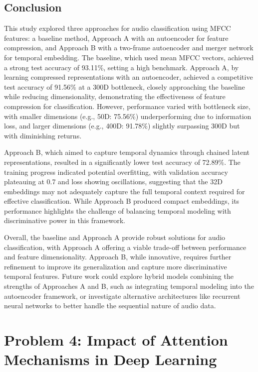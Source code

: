 \documentclass[12pt]{article}
\begin{document}
\subsection{Conclusion}

This study explored three approaches for audio classification using MFCC features: a baseline method, Approach A with an autoencoder for feature compression, and Approach B with a two-frame autoencoder and merger network for temporal embedding. The baseline, which used mean MFCC vectors, achieved a strong test accuracy of 93.11\%, setting a high benchmark. Approach A, by learning compressed representations with an autoencoder, achieved a competitive test accuracy of 91.56\% at a 300D bottleneck, closely approaching the baseline while reducing dimensionality, demonstrating the effectiveness of feature compression for classification. However, performance varied with bottleneck size, with smaller dimensions (e.g., 50D: 75.56\%) underperforming due to information loss, and larger dimensions (e.g., 400D: 91.78\%) slightly surpassing 300D but with diminishing returns.

Approach B, which aimed to capture temporal dynamics through chained latent representations, resulted in a significantly lower test accuracy of 72.89\%. The training progress indicated potential overfitting, with validation accuracy plateauing at 0.7 and loss showing oscillations, suggesting that the 32D embeddings may not adequately capture the full temporal context required for effective classification. While Approach B produced compact embeddings, its performance highlights the challenge of balancing temporal modeling with discriminative power in this framework.

Overall, the baseline and Approach A provide robust solutions for audio classification, with Approach A offering a viable trade-off between performance and feature dimensionality. Approach B, while innovative, requires further refinement to improve its generalization and capture more discriminative temporal features. Future work could explore hybrid models combining the strengths of Approaches A and B, such as integrating temporal modeling into the autoencoder framework, or investigate alternative architectures like recurrent neural networks to better handle the sequential nature of audio data.



\newpage
\section{Problem 4: Impact of Attention Mechanisms in Deep Learning}
\end{document}

